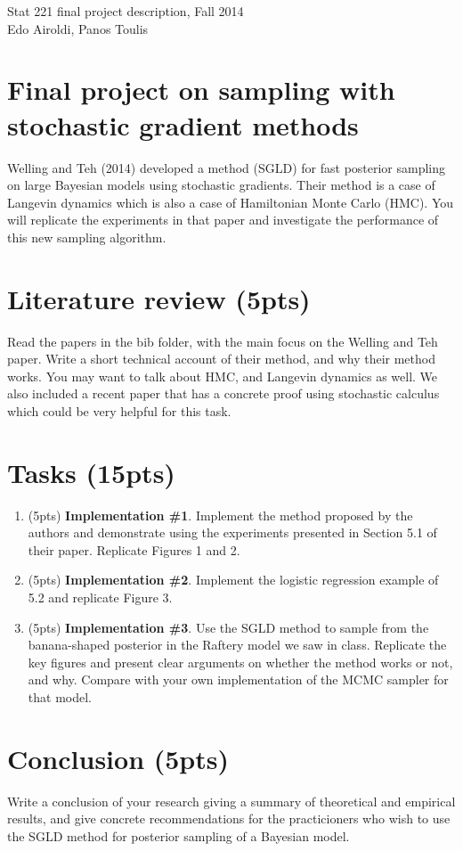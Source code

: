\documentclass[12pt]{article}
\begin{document}
Stat 221 final project description, Fall 2014 \\
Edo Airoldi, Panos Toulis
\section*{Final project on sampling with stochastic gradient methods}
Welling and Teh (2014) developed a method (SGLD) for fast posterior sampling on large Bayesian models using stochastic gradients. Their method is a case of Langevin dynamics which is also a case of Hamiltonian Monte Carlo (HMC). You will replicate the experiments in that paper and investigate the performance of this new sampling algorithm.

\section{Literature review (5pts)}
Read the papers in the bib folder, with the main focus on the Welling and Teh paper.
Write a short technical account of their method, and why their method works. You may want to talk about HMC, and Langevin dynamics as well.
We also included a recent paper that has a concrete proof using stochastic calculus which 
could be very helpful for this task.

\section{Tasks (15pts)}
\begin{enumerate}
\item (5pts) \textbf{Implementation \#1}. Implement the method proposed by the authors 
	and demonstrate using the experiments presented in Section 5.1 of their paper.
	Replicate Figures 1 and 2. 
\item (5pts)  \textbf{Implementation \#2}. 
	Implement the logistic regression example of 5.2 and replicate Figure 3.
\item (5pts) \textbf{Implementation \#3}. Use the SGLD method to sample from the banana-shaped 
posterior in the Raftery model we saw in class. Replicate the key figures and 
	present clear arguments on whether the method works or not, and why.
	Compare with your own implementation of the MCMC sampler for that model.
\end{enumerate}

\section{Conclusion (5pts)}
Write a conclusion of your research giving a summary of theoretical and empirical results,
and give concrete recommendations for the practicioners who wish to use the  SGLD method for 
posterior sampling of a Bayesian model.
\end{document}
